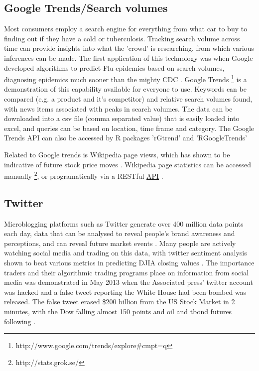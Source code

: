 \documentclass[11pt]{article}
\begin{document}
	\subsection{Google Trends/Search volumes}
	Most consumers employ a search engine for everything from what car to buy to finding out if they have a cold or tuberculosis.
	Tracking search volume across time can provide insights into what the 'crowd' is researching, from which various inferences can be made.
	The first application of this technology was when Google developed algorithms to predict Flu epidemics based on search volumes, diagnosing epidemics much sooner than the mighty CDC \cite{Ginsberg2009}.
	Google Trends \footnote{http://www.google.com/trends/explore\#cmpt=q} is a demonstration of this capability available for everyone to use. 
	Keywords can be compared (e.g. a product and it's competitor) and relative search volumes found, with news items associated with peaks in search volumes. 
	The data can be downloaded into a csv file (comma separated value) that is easily loaded into excel, and queries can be based on location, time frame and category.
	The Google Trends API can also be accessed by R packages 'rGtrend' and 'RGoogleTrends'
		

	Related to Google trends is Wikipedia page views, which has shown to be indicative of future stock price moves \cite{Moat2013}.
	Wikipedia page statistics can be accessed manually \footnote{http://stats.grok.se/}, or programatically via a RESTful \hyperref[api]{API} \cite{Peetz}. 

	\subsection{Twitter}
	Microblogging platforms such as Twitter generate over 400 million data points each day, data that can be analysed to reveal people's brand awareness and perceptions, and can reveal future market events \cite{Ruiz2012}.
	Many people are actively watching social media and trading on this data, with twitter sentiment analysis shown to beat various metrics in predicting DJIA closing values \cite{Bollen2011}.
	The importance traders and their algorithmic trading programs place on information from social media was demonstrated in May 2013 when the Associated press' twitter account was hacked and a false tweet reporting the White House had been bombed was released. 
	The false tweet erased \$200 billion from the US Stock Market in 2 minutes, with the Dow falling almost 150 points and oil and tbond futures following \cite{wsj13}. 
\end{document}
